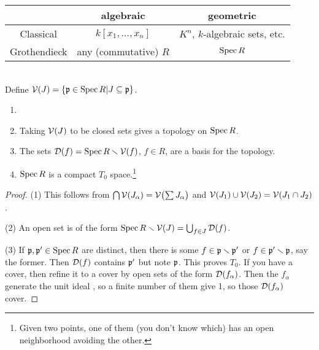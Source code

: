  \begin{tabular}{c|c|c|}
    & algebraic & geometric\\ \hline
   Classical & $k[x_1,\dots, x_n]$ & $K^n$, $k$-algebraic sets, etc. \\ \hline
   Grothendieck & any (commutative) $R$ & $\operatorname{Spec} R$
 \end{tabular}\\
 Define $\mathcal{V}(J)=\{\mathfrak{p}\in \operatorname{Spec} R| J\subseteq \mathfrak{p}\}$.
 \begin{theorem}
  \begin{enumerate}\item[]
   \item Taking $\mathcal{V}(J)$ to be closed sets gives a topology on $\operatorname{Spec} R$.
   \item The sets $\mathcal{D}(f) = \operatorname{Spec} R\smallsetminus \mathcal{V}(f)$, $f\in R$, are a basis for
         the topology.
   \item $\operatorname{Spec} R$ is a compact $T_0$ space.\footnote{Given two points, one of them
         (you don't know which) has an open neighborhood avoiding the other.}
  \end{enumerate}
 \end{theorem}
 \begin{proof}
  (1) This follows from $\bigcap \mathcal{V}(J_\alpha)=\mathcal{V}\bigl( \sum J_\alpha \bigr)$ and
  $\mathcal{V}(J_1)\cup \mathcal{V}(J_2)=\mathcal{V}(J_1\cap J_2)$.

  (2) An open set is of the form $\operatorname{Spec} R\smallsetminus \mathcal{V}(J) = \bigcup_{f\in J}\mathcal{D}(f)$.

  (3) If $\mathfrak{p},\mathfrak{p}'\in \operatorname{Spec} R$ are distinct, then there is some $f\in \mathfrak{p}\smallsetminus \mathfrak{p}'$
  or $f\in \mathfrak{p}'\smallsetminus \mathfrak{p}$, say the former. Then $\mathcal{D}(f)$ contains $\mathfrak{p}'$ but note
  $\mathfrak{p}$. This proves $T_0$. If you have a cover, then refine it to a cover by open sets of
  the form $\mathcal{D}(f_\alpha)$. Then the $f_\alpha$ generate the unit ideal \anton{}, so a
  finite number of them give 1, so those $\mathcal{D}(f_\alpha)$ cover.
 \end{proof}
